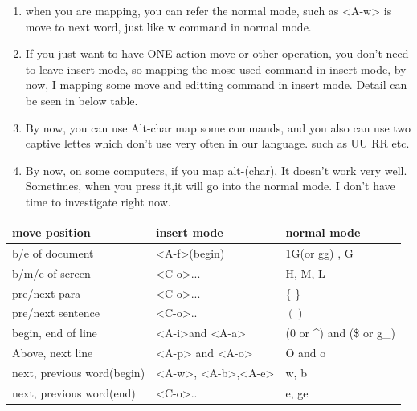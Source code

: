 \documentclass[a4paper,12pt,twoside]{book}
\begin{document}
\begin{itemize}
\begin{itemize}
\begin{enumerate}
					\item when you are mapping, you can refer the normal mode, such as <A-w> is move to next word, just like w command in normal mode.

					\item If you just want to have ONE action move or other operation, you don't need to leave insert mode, so mapping the mose used command in insert mode, by now, I mapping some move and editting command in insert mode. Detail can be seen in below table.

					\item By now, you can use Alt-char map some commands, and you also can use two captive lettes which don't use very often in our language. such as UU RR etc. 

					\item By now, on some computers, if you map alt-(char), It doesn't work very well. Sometimes, when you press it,it will go into the normal mode. I don't have time to investigate right now. 
			\end{enumerate}


	\begin{center}
		\begin{tabular}{p{}|p{}|p{}}
		\hline 
        move position & insert mode & normal mode \\

		\hline
		b/e of document &  <A-f>(begin)  & 1G(or gg) , G  \\

	    \hline 
		b/m/e of screen & <C-o>... & H, M, L \\

		\hline 
		pre/next para & <C-o>... &\{ \} \\

		\hline 

		pre/next sentence & <C-o>.. & $( )$ \\
		
		\hline 
		begin, end of line &<A-i>and <A-a> & (0 or \^{}) and (\$ or g\_)  \\
		

        \hline 
        Above, next line &<A-p> and <A-o> & O and o\\

	   	\hline 		
		next, previous word(begin) &<A-w>, <A-b>,<A-e>  & w, b\\   

	    \hline
	    next, previous word(end) & <C-o>.. & e, ge \\
 	

\end{tabular}
\end{center}
\end{itemize}
\end{itemize}
\end{document}
